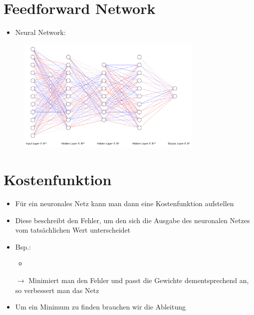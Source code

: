 \documentclass[t]{beamer}
\begin{document}
\section{Feedforward Network}
\begin{frame}
    \begin{itemize}
        \item Neural Network:
    \end{itemize}
    \begin{figure}
        \centering
        \includegraphics[width=0.8\textwidth]{./images/example-nn-crop.pdf}
    \end{figure}
\end{frame}

\section{Kostenfunktion}
\begin{frame}
    \begin{itemize}
        \item Für ein neuronales Netz kann man dann eine Kostenfunktion aufstellen
        \item Diese beschreibt den Fehler, um den sich die Ausgabe des neuronalen Netzes vom tatsächlichen Wert unterscheidet \newline
        \item Bsp.:
        \begin{itemize}
            \item 
        \end{itemize}
        \item[\(\rightarrow\)] Minimiert man den Fehler und passt die Gewichte dementsprechend an, so verbessert man das Netz \newline
        \item Um ein Minimum zu finden brauchen wir die Ableitung
    \end{itemize}
\end{frame}
\end{document}
